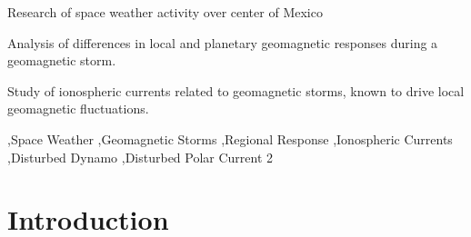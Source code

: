 \documentclass[a4paper,fleqn]{cas-dc}
\begin{document}
\begin{highlights} 
\item Research of space weather activity over center of Mexico

\item Analysis of differences in local and planetary geomagnetic responses during a geomagnetic storm. 
\item Study of ionospheric currents related to geomagnetic storms, known to drive local geomagnetic fluctuations. 
\end{highlights}

\begin{keywords}
 \sep Space Weather \sep Geomagnetic Storms \sep Regional Response \sep Ionospheric Currents \sep Disturbed Dynamo \sep Disturbed Polar Current 2  
\end{keywords}

\maketitle
\section{Introduction}
     \label{S-Introduction} 


\end{document}
